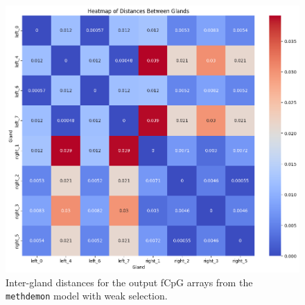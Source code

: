 \begin{figure}[h]
    \centering
    \includegraphics[width=\textwidth]{Chapter_5/figures/10000dist.png}
    \caption{Inter-gland distances for the output fCpG arrays from the
    \texttt{methdemon} model with weak selection.}
    \label{fig:methdemon_weak_dist}
\end{figure}

